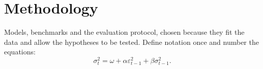 \chapter{Methodology}

Models, benchmarks and the evaluation protocol, chosen because they fit the data and allow the hypotheses to be tested. Define notation once and number the equations:
\begin{equation}
  \sigma_t^2 = \omega + \alpha \varepsilon_{t-1}^2 + \beta \sigma_{t-1}^2 .
\end{equation}
